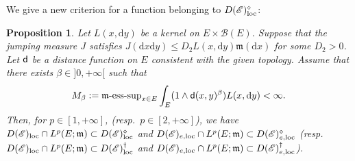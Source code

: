 \documentclass[12pt,a4paper]{article}
\newtheorem{prop}[thm]{Proposition}
\renewcommand{\d}{\mathrm{d}}
\newcommand{\m}{\mathfrak{m} }
\newcommand{\loc}{{\rm loc}}
\newcommand{\1}{{\bf 1}}
\begin{document}
We give a new criterion for a function belonging to  $D(\mathscr{E})_{\loc}^{\diamond}$: 
\begin{prop}\label{prop:newcriterion}
Let $L(x,{\d} y)$ be a kernel on $E\times\mathscr{B}(E)$. Suppose that the jumping measure $J$ satisfies $J({\d} x{\d} y)\leq D_2L(x,{\d} y)\m({\d} x)$ for some $D_2>0$.
Let ${\sf d}$ be a distance function on $E$ consistent with the given topology. Assume that there exists $\beta\in]0,+\infty[$ such that 
\begin{align*}
M_{\beta}:={\m}\text{\rm-ess-sup}_{x\in E}\int_E(1\land {\sf d}(x,y)^{\beta})L(x,{\d} y)<\infty.
\end{align*} 
Then, for $p\in[1,+\infty]$, {\rm(}resp.~$p\in[2,+\infty]${\rm)}, 
we have 
 $D(\mathscr{E})_{\loc}\cap L^p(E;{\m})\subset D(\mathscr{E})_{\loc}^{\diamond}$ 
and $D(\mathscr{E})_{e,\loc}\cap L^p(E;{\m})\subset D(\mathscr{E})_{e,\loc}^{\diamond}$ {\rm(}resp.~$D(\mathscr{E})_{\loc}\cap L^p(E;{\m})\subset D(\mathscr{E})_{\loc}^{\dag}$ 
and $D(\mathscr{E})_{e,\loc}\cap L^p(E;{\m})\subset D(\mathscr{E})_{e,\loc}^{\dag}${\rm)}.
\end{prop}  
\end{document}
